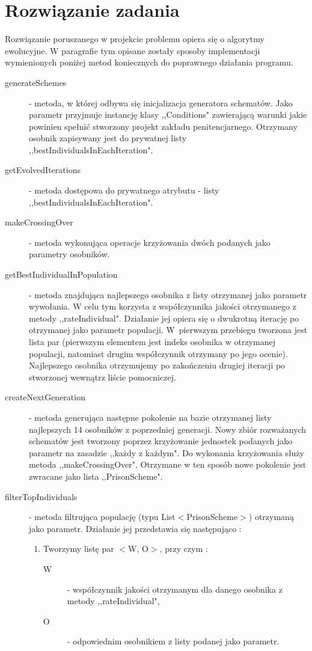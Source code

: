 \documentclass[10pt,oneside]{article}
\begin{document}
	\section{Rozwiązanie zadania}
	Rozwiązanie poruszanego w projekcie problemu opiera się o algorytmy ewolucyjne. W paragrafie tym opisane zostały sposoby implementacji wymienionych poniżej metod koniecznych do poprawnego działania programu.
	\begin{description}
		\item[generateSchemes] - metoda, w której odbywa się inicjalizacja generatora schematów. Jako parametr przyjmuje instancję klasy ,,Conditions" zawierającą warunki jakie powinien spełnić stworzony projekt zakładu penitencjarnego. Otrzymany osobnik zapisywany jest do prywatnej listy ,,bestIndividualsInEachIteration".
		
		\item[getEvolvedIterations] - metoda dostępowa do prywatnego atrybutu - listy ,,bestIndividualsInEachIteration".
		
		\item[makeCrossingOver] - metoda wykonująca operacje krzyżowania dwóch podanych jako parametry osobników.
		
		\item[getBestIndividualInPopulation] - metoda znajdująca najlepszego osobnika z listy otrzymanej jako parametr wywołania. W celu tym korzysta z współczynnika jakości otrzymanego z metody ,,rateIndividual". Działanie jej opiera się o dwukrotną iterację po otrzymanej jako parametr populacji. W~pierwszym przebiegu tworzona jest lista par (pierwszym elementem jest indeks osobnika w otrzymanej populacji, natomiast drugim współczynnik otrzymany po jego ocenie). Najlepszego osobnika otrzymujemy po zakończeniu drugiej iteracji po stworzonej wewnątrz liście pomocniczej.
		
		\item[createNextGeneration] - metoda generująca następne pokolenie na bazie otrzymanej listy najlepszych 14 osobników z poprzedniej generacji. Nowy zbiór rozważanych schematów jest tworzony poprzez krzyżowanie jednostek podanych jako parametr na zasadzie ,,każdy z każdym". Do wykonania krzyżowania służy metoda ,,makeCrossingOver".
		Otrzymane w ten sposób nowe pokolenie jest zwracane jako lista ,,PrisonScheme".
		
		\item[filterTopIndividuals] - metoda filtrująca populację (typu List$<$PrisonScheme$>$) otrzymaną jako parametr. Działanie jej przedstawia się następująco :
		\begin{enumerate}
			\item Tworzymy listę par $<$W, O$>$, \newline przy czym : 
			\begin{description}
				\item[W] - współczynnik jakości otrzymanym dla danego osobnika z metody ,,rateIndividual",
				\item[O] - odpowiednim osobnikiem z listy podanej jako parametr.
			\end{description} 
			

\end{enumerate}
\end{description}
\end{document}
